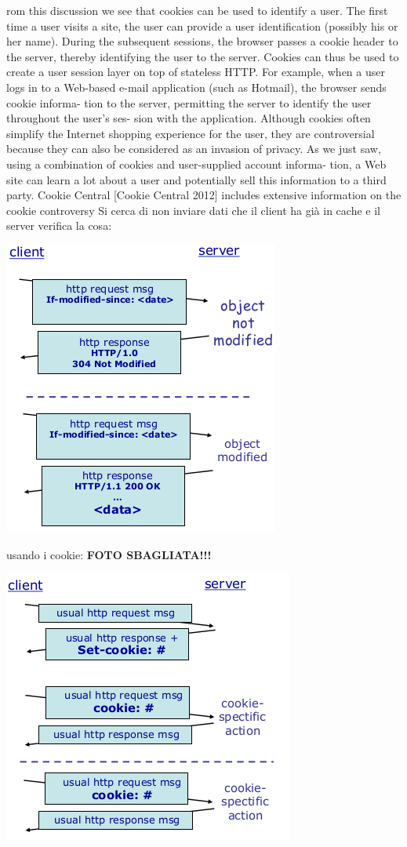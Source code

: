 \documentclass[a4paper,12pt, oneside]{book}
\begin{document}
rom this discussion we see that cookies can be used to identify a user. The first
time a user visits a site, the user can provide a user identification (possibly his or her
name). During the subsequent sessions, the browser passes a cookie header to the
server, thereby identifying the user to the server. Cookies can thus be used to create
a user session layer on top of stateless HTTP. For example, when a user logs in to a
Web-based e-mail application (such as Hotmail), the browser sends cookie informa-
tion to the server, permitting the server to identify the user throughout the user’s ses-
sion with the application.
Although cookies often simplify the Internet shopping experience for the user,
they are controversial because they can also be considered as an invasion of privacy.
As we just saw, using a combination of cookies and user-supplied account informa-
tion, a Web site can learn a lot about a user and potentially sell this information to a
third party. Cookie Central [Cookie Central 2012] includes extensive information
on the cookie controversy
Si cerca di non inviare dati che il client ha già in cache e il server verifica la cosa:
\begin{center}
	\includegraphics[scale=0.7]{img/http4.png}
\end{center}
usando i cookie:
\textbf{FOTO SBAGLIATA!!!}
\begin{center}
	\includegraphics[scale=0.7]{img/http5.png}
\end{center}
\end{document}
